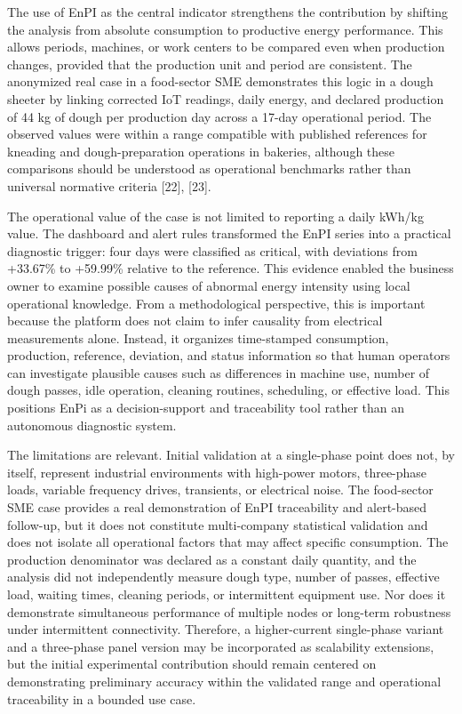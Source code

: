 \documentclass{ieeeaccess}
\begin{document}
The use of EnPI as the central indicator strengthens the contribution by shifting the analysis from absolute consumption to productive energy performance. This allows periods, machines, or work centers to be compared even when production changes, provided that the production unit and period are consistent. The anonymized real case in a food-sector SME demonstrates this logic in a dough sheeter by linking corrected IoT readings, daily energy, and declared production of 44 kg of dough per production day across a 17-day operational period. The observed values were within a range compatible with published references for kneading and dough-preparation operations in bakeries, although these comparisons should be understood as operational benchmarks rather than universal normative criteria [22], [23].

The operational value of the case is not limited to reporting a daily kWh/kg value. The dashboard and alert rules transformed the EnPI series into a practical diagnostic trigger: four days were classified as critical, with deviations from +33.67\% to +59.99\% relative to the reference. This evidence enabled the business owner to examine possible causes of abnormal energy intensity using local operational knowledge. From a methodological perspective, this is important because the platform does not claim to infer causality from electrical measurements alone. Instead, it organizes time-stamped consumption, production, reference, deviation, and status information so that human operators can investigate plausible causes such as differences in machine use, number of dough passes, idle operation, cleaning routines, scheduling, or effective load. This positions EnPi as a decision-support and traceability tool rather than an autonomous diagnostic system.

The limitations are relevant. Initial validation at a single-phase point does not, by itself, represent industrial environments with high-power motors, three-phase loads, variable frequency drives, transients, or electrical noise. The food-sector SME case provides a real demonstration of EnPI traceability and alert-based follow-up, but it does not constitute multi-company statistical validation and does not isolate all operational factors that may affect specific consumption. The production denominator was declared as a constant daily quantity, and the analysis did not independently measure dough type, number of passes, effective load, waiting times, cleaning periods, or intermittent equipment use. Nor does it demonstrate simultaneous performance of multiple nodes or long-term robustness under intermittent connectivity. Therefore, a higher-current single-phase variant and a three-phase panel version may be incorporated as scalability extensions, but the initial experimental contribution should remain centered on demonstrating preliminary accuracy within the validated range and operational traceability in a bounded use case.
\end{document}
